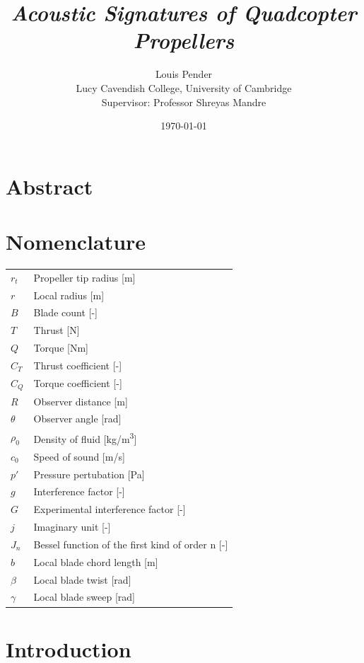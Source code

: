 \documentclass[12pt,a4paper]{article}
\title{\vspace{-2cm} \textit{Acoustic Signatures of Quadcopter Propellers}}
\author{Louis Pender \\
        Lucy Cavendish College, University of Cambridge \\
        Supervisor: Professor Shreyas Mandre
        }
\date{\today}
\begin{document}
\maketitle

\thispagestyle{empty} %

\section*{Abstract}



\newpage
\tableofcontents

\section*{Nomenclature}
\begin{tabular}{ll}
    $r_t$        & Propeller tip radius [m] \\
    $r$        & Local radius [m] \\
    $B$        & Blade count [-] \\
    $T$        & Thrust [N] \\
    $Q$        & Torque [Nm] \\
    $C_T$      & Thrust coefficient [-] \\
    $C_Q$      & Torque coefficient [-] \\
    $R$        & Observer distance [m] \\
    $\theta$   & Observer angle [rad] \\
    $\rho_0$     & Density of fluid [kg/m\textsuperscript{3}] \\
    $c_0$   & Speed of sound [m/s] \\
    $p'$      & Pressure pertubation [Pa] \\
    $g$      & Interference factor [-] \\
    $G$     & Experimental interference factor [-] \\
    $j$     & Imaginary unit [-] \\
    $J_{n}$ & Bessel function of the first kind of order n [-] \\
    $b$      & Local blade chord length [m] \\
    $\beta$  & Local blade twist [rad] \\
    $\gamma$ & Local blade sweep [rad] \\
\end{tabular}

\newpage
\section{Introduction}
\end{document}

